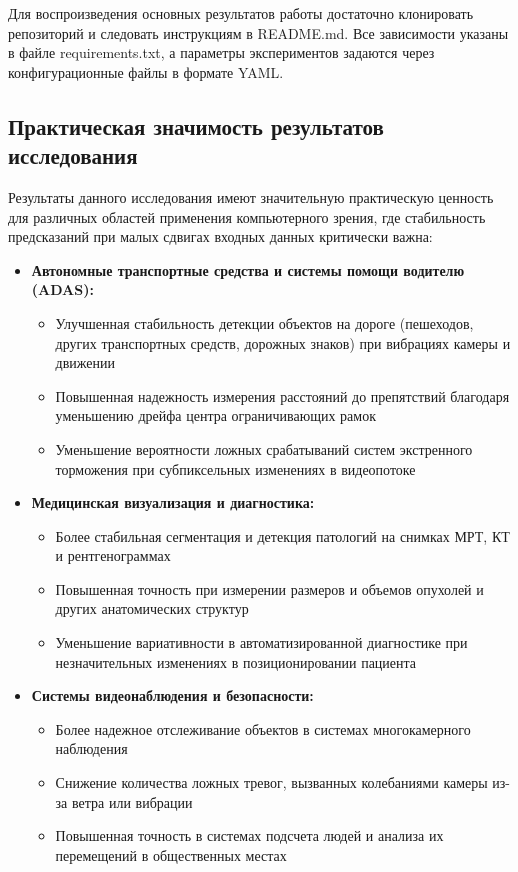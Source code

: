Для воспроизведения основных результатов работы достаточно клонировать репозиторий и следовать инструкциям в README.md. Все зависимости указаны в файле requirements.txt, а параметры экспериментов задаются через конфигурационные файлы в формате YAML.

\subsection{Практическая значимость результатов исследования}
\label{sec:practical_significance}

Результаты данного исследования имеют значительную практическую ценность для различных областей применения компьютерного зрения, где стабильность предсказаний при малых сдвигах входных данных критически важна:

\begin{itemize}
    \item \textbf{Автономные транспортные средства и системы помощи водителю (ADAS):}
    \begin{itemize}
        \item Улучшенная стабильность детекции объектов на дороге (пешеходов, других транспортных средств, дорожных знаков) при вибрациях камеры и движении
        \item Повышенная надежность измерения расстояний до препятствий благодаря уменьшению дрейфа центра ограничивающих рамок
        \item Уменьшение вероятности ложных срабатываний систем экстренного торможения при субпиксельных изменениях в видеопотоке
    \end{itemize}
    
    \item \textbf{Медицинская визуализация и диагностика:}
    \begin{itemize}
        \item Более стабильная сегментация и детекция патологий на снимках МРТ, КТ и рентгенограммах
        \item Повышенная точность при измерении размеров и объемов опухолей и других анатомических структур
        \item Уменьшение вариативности в автоматизированной диагностике при незначительных изменениях в позиционировании пациента
    \end{itemize}
    
    \item \textbf{Системы видеонаблюдения и безопасности:}
    \begin{itemize}
        \item Более надежное отслеживание объектов в системах многокамерного наблюдения
        \item Снижение количества ложных тревог, вызванных колебаниями камеры из-за ветра или вибрации
        \item Повышенная точность в системах подсчета людей и анализа их перемещений в общественных местах
    \end{itemize}
    

\end{itemize}
